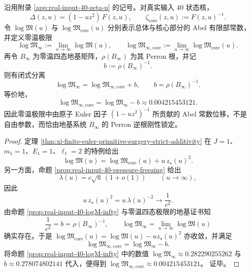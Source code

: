 \begin{corollary}\label{cor:xi-real-input40-zero-temp-core-abel-constant-splitting}
沿用附录 \ref{app:real-input-40-zeta-u} 的记号。对真实输入 \(40\) 状态核，
\[
\Delta(z,u)=(1-uz^2)\,F(z,u),
\qquad
\zeta_{\mathrm{core}}(z,u):=F(z,u)^{-1}.
\]
令 \(\log\mathfrak M(u)\) 与 \(\log\mathfrak M_{\mathrm{core}}(u)\) 分别表示总体与核心部分的 Abel 有限部常数，并定义零温极限
\[
\log\mathfrak M_\infty:=\lim_{u\to\infty}\log\mathfrak M(u),
\qquad
\log\mathfrak M_{\infty,\mathrm{core}}
:=
\lim_{u\to\infty}\log\mathfrak M_{\mathrm{core}}(u).
\]
再令 \(B_\infty\) 为零温四态地基矩阵，\(\rho(B_\infty)\) 为其 Perron 根，并记
\[
b:=\rho(B_\infty)^{-1}.
\]
则有闭式分离
\[
\boxed{\;
\log\mathfrak M_\infty
=
\log\mathfrak M_{\infty,\mathrm{core}}+b,
\qquad
b=\rho(B_\infty)^{-1}.\;}
\]
等价地，
\[
\boxed{\;
\log\mathfrak M_{\infty,\mathrm{core}}
=
\log\mathfrak M_\infty-b
\approx 0.004215453121.\;}
\]
因此零温极限中由原子 Euler 因子 \((1-uz^2)^{-1}\) 所贡献的 Abel 常数位移，不是自由参数，而恰由地基系统 \(B_\infty\) 的 Perron 逆根刚性锁定。
\end{corollary}
\begin{proof}
定理 \ref{thm:xi-finite-euler-primitive-surgery-strict-additivity} 在 \(J=1\)、\(m_1=1\)、\(E_1=1\)、\(\ell_1=2\) 的特例给出
\[
\log\mathfrak M(u)
=
\log\mathfrak M_{\mathrm{core}}(u)+u\,z_\star(u)^2.
\]
另一方面，命题 \ref{prop:real-input-40-pressure-freezing} 给出
\[
\lambda(u)=c\sqrt u\,(1+o(1))
\qquad(u\to\infty),
\]
因此
\[
u\,z_\star(u)^2
=
u\,\lambda(u)^{-2}
\longrightarrow
\frac{1}{c^2}.
\]
由命题 \ref{prop:real-input-40-logM-infty} 与零温四态极限的地基证书知
\[
\frac{1}{c^2}=b=\rho(B_\infty)^{-1},
\qquad
\log\mathfrak M_\infty=\lim_{u\to\infty}\log\mathfrak M(u)
\]
确实存在。于是 \(\log\mathfrak M_{\mathrm{core}}(u)=\log\mathfrak M(u)-u z_\star(u)^2\) 亦收敛，并满足
\[
\log\mathfrak M_{\infty,\mathrm{core}}
=
\log\mathfrak M_\infty-b.
\]
将命题 \ref{prop:real-input-40-logM-infty} 中的数值
\(
\log\mathfrak M_\infty\approx 0.282290255262
\)
与
\(
b\approx 0.278074802141
\)
代入，便得到
\(
\log\mathfrak M_{\infty,\mathrm{core}}\approx 0.004215453121
\)。
证毕。
\end{proof}

